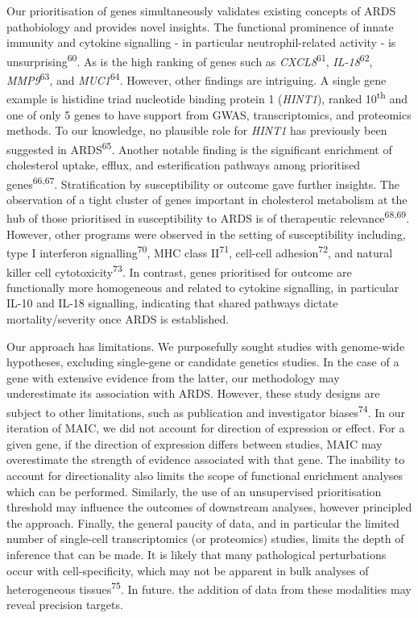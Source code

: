 \documentclass[
  11,
  a4paper,
]{article}
\begin{document}
Our prioritisation of genes simultaneously validates existing concepts
of ARDS pathobiology and provides novel insights. The functional
prominence of innate immunity and cytokine signalling - in particular
neutrophil-related activity - is unsurprising\textsuperscript{60}. As is
the high ranking of genes such as \emph{CXCL8}\textsuperscript{61},
\emph{IL-18}\textsuperscript{62}, \emph{MMP9}\textsuperscript{63}, and
\emph{MUC1}\textsuperscript{64}. However, other findings are intriguing.
A single gene example is histidine triad nucleotide binding protein 1
(\emph{HINT1}), ranked 10\textsuperscript{th} and one of only 5 genes to
have support from GWAS, transcriptomics, and proteomics methods. To our
knowledge, no plausible role for \emph{HINT1} has previously been
suggested in ARDS\textsuperscript{65}. Another notable finding is the
significant enrichment of cholesterol uptake, efflux, and esterification
pathways among prioritised genes\textsuperscript{66,67}. Stratification
by susceptibility or outcome gave further insights. The observation of a
tight cluster of genes important in cholesterol metabolism at the hub of
those prioritised in susceptibility to ARDS is of therapeutic
relevance\textsuperscript{68,69}. However, other programs were observed
in the setting of susceptibility including, type I interferon
signalling\textsuperscript{70}, MHC class II\textsuperscript{71},
cell-cell adhesion\textsuperscript{72}, and natural killer cell
cytotoxicity\textsuperscript{73}. In contrast, genes prioritised for
outcome are functionally more homogeneous and related to cytokine
signalling, in particular IL-10 and IL-18 signalling, indicating that
shared pathways dictate mortality/severity once ARDS is established.

Our approach has limitations. We purposefully sought studies with
genome-wide hypotheses, excluding single-gene or candidate genetics
studies. In the case of a gene with extensive evidence from the latter,
our methodology may underestimate its association with ARDS. However,
these study designs are subject to other limitations, such as
publication and investigator biases\textsuperscript{74}. In our
iteration of MAIC, we did not account for direction of expression or
effect. For a given gene, if the direction of expression differs between
studies, MAIC may overestimate the strength of evidence associated with
that gene. The inability to account for directionality also limits the
scope of functional enrichment analyses which can be performed.
Similarly, the use of an unsupervised prioritisation threshold may
influence the outcomes of downstream analyses, however principled the
approach. Finally, the general paucity of data, and in particular the
limited number of single-cell transcriptomics (or proteomics) studies,
limits the depth of inference that can be made. It is likely that many
pathological perturbations occur with cell-specificity, which may not be
apparent in bulk analyses of heterogeneous tissues\textsuperscript{75}.
In future. the addition of data from these modalities may reveal
precision targets.
\end{document}
